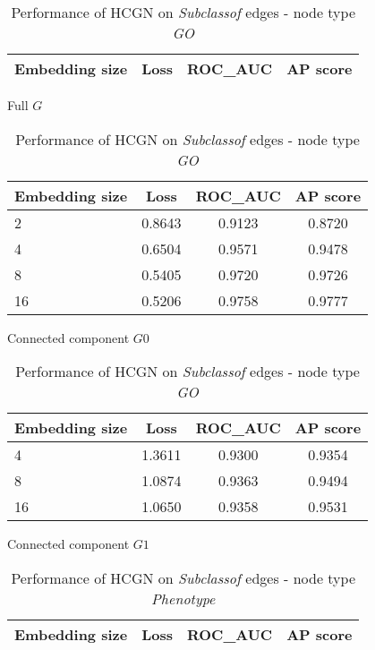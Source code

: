 \begin{table}[h]
    \centering
    \begin{subtable}[t]{\textwidth}
        \centering
        \begin{tabular}{lccc}        
            \toprule
            \textbf{Embedding size} & \textbf{Loss} & \textbf{ROC\_AUC} & \textbf{AP score} \\
            \midrule
            \bottomrule
        \end{tabular}
        \caption{Full $G$}
    \end{subtable}
    
    \vspace{1em}
    
    \begin{subtable}[t]{\textwidth}
        \centering
        \begin{tabular}{lccc}        
            \toprule
            \textbf{Embedding size} & \textbf{Loss} & \textbf{ROC\_AUC} & \textbf{AP score} \\
            \midrule
            2 & 0.8643 & 0.9123 & 0.8720 \\
            4 & 0.6504 & 0.9571 & 0.9478 \\
            8 & 0.5405 & 0.9720 & 0.9726 \\
            16 & 0.5206 & 0.9758 & 0.9777 \\
            \bottomrule
        \end{tabular}
        \caption{Connected component $G0$}
    \end{subtable}
    
    \vspace{1em}
    
    \begin{subtable}[t]{\textwidth}
        \centering
        \begin{tabular}{lccc}        
            \toprule
            \textbf{Embedding size} & \textbf{Loss} & \textbf{ROC\_AUC} & \textbf{AP score} \\
            \midrule
            4 & 1.3611 & 0.9300 & 0.9354 \\
            8 & 1.0874 & 0.9363 & 0.9494 \\
            16 & 1.0650 & 0.9358 & 0.9531 \\
            \bottomrule
        \end{tabular}
        \caption{Connected component $G1$}
    \end{subtable}
    \caption{Performance of HCGN on \textit{Subclassof} edges - node type \textit{GO}}
\end{table}

\begin{table}[h]
    \centering
    \begin{tabular}{lccc}        
        \toprule
        \textbf{Embedding size} & \textbf{Loss} & \textbf{ROC\_AUC} & \textbf{AP score} \\
        \midrule
        \bottomrule
    \end{tabular}
    \caption{Performance of HCGN on \textit{Subclassof} edges - node type \textit{Phenotype}}
\end{table}



